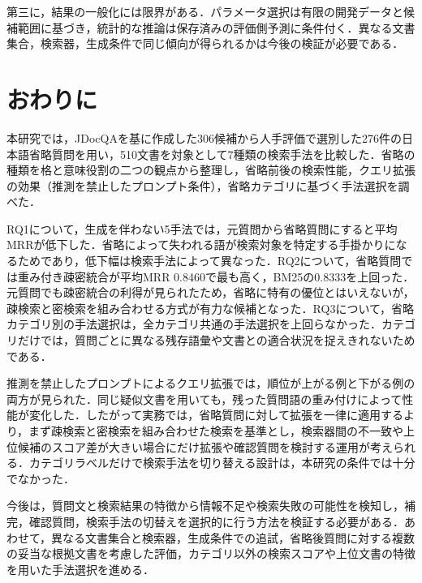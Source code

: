 \documentclass[twocolumn,a4paper,10pt]{ltjsarticle}
\begin{document}
第三に，結果の一般化には限界がある．パラメータ選択は有限の開発データと候補範囲に基づき，統計的な推論は保存済みの評価側予測に条件付く．異なる文書集合，検索器，生成条件で同じ傾向が得られるかは今後の検証が必要である．

\normalsize
\section{おわりに}
本研究では，JDocQAを基に作成した306候補から人手評価で選別した276件の日本語省略質問を用い，510文書を対象として7種類の検索手法を比較した．省略の種類を格と意味役割の二つの観点から整理し，省略前後の検索性能，クエリ拡張の効果（推測を禁止したプロンプト条件），省略カテゴリに基づく手法選択を調べた．

RQ1について，生成を伴わない5手法では，元質問から省略質問にすると平均MRRが低下した．省略によって失われる語が検索対象を特定する手掛かりになるためであり，低下幅は検索手法によって異なった．RQ2について，省略質問では重み付き疎密統合が平均MRR 0.8460で最も高く，BM25の0.8333を上回った．元質問でも疎密統合の利得が見られたため，省略に特有の優位とはいえないが，疎検索と密検索を組み合わせる方式が有力な候補となった．RQ3について，省略カテゴリ別の手法選択は，全カテゴリ共通の手法選択を上回らなかった．カテゴリだけでは，質問ごとに異なる残存語彙や文書との適合状況を捉えきれないためである．

推測を禁止したプロンプトによるクエリ拡張では，順位が上がる例と下がる例の両方が見られた．同じ疑似文書を用いても，残った質問語の重み付けによって性能が変化した．したがって実務では，省略質問に対して拡張を一律に適用するより，まず疎検索と密検索を組み合わせた検索を基準とし，検索器間の不一致や上位候補のスコア差が大きい場合にだけ拡張や確認質問を検討する運用が考えられる．カテゴリラベルだけで検索手法を切り替える設計は，本研究の条件では十分でなかった．

今後は，質問文と検索結果の特徴から情報不足や検索失敗の可能性を検知し，補完，確認質問，検索手法の切替えを選択的に行う方法を検証する必要がある．あわせて，異なる文書集合と検索器，生成条件での追試，省略後質問に対する複数の妥当な根拠文書を考慮した評価，カテゴリ以外の検索スコアや上位文書の特徴を用いた手法選択を進める．

\begingroup


\endgroup

\appendix
\end{document}
